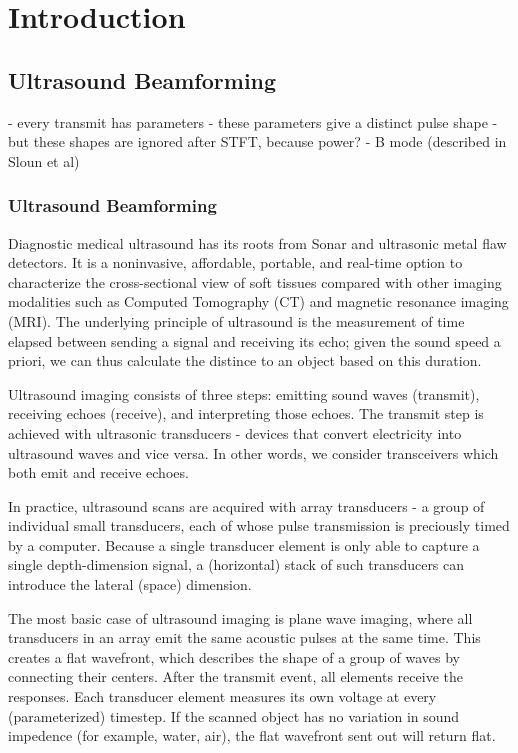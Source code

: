 \chapter{Introduction}

\section{Ultrasound Beamforming}

- every transmit has parameters
- these parameters give a distinct pulse shape
- but these shapes are ignored after STFT, because power?
- B mode (described in Sloun et al)

\subsection{Ultrasound Beamforming}
 Diagnostic medical ultrasound has its roots from Sonar and ultrasonic metal flaw detectors. It is a noninvasive, affordable, portable, and real-time option to characterize the cross-sectional view of soft tissues compared with other imaging modalities such as Computed Tomography (CT) and magnetic resonance imaging (MRI). The underlying principle of ultrasound is the measurement of time elapsed between sending a signal and receiving its echo; given the sound speed a priori, we can thus calculate the distince to an object based on this duration.

 Ultrasound imaging consists of three steps: emitting sound waves (transmit), receiving echoes (receive), and interpreting those echoes. The transmit step is achieved with ultrasonic transducers - devices that convert electricity into ultrasound waves and vice versa. In other words, we consider transceivers which both emit and receive echoes.

 In practice, ultrasound scans are acquired with array transducers - a group of individual small transducers, each of whose pulse transmission is preciously timed by a computer. Because a single transducer element is only able to capture a single depth-dimension signal, a (horizontal) stack of such transducers can introduce the lateral (space) dimension.

 The most basic case of ultrasound imaging is plane wave imaging, where all transducers in an array emit the same acoustic pulses at the same time. This creates a flat wavefront, which describes the shape of a group of waves by connecting their centers. After the transmit event, all elements receive the responses. Each transducer element measures its own voltage at every (parameterized) timestep. If the scanned object has no variation in sound impedence (for example, water, air), the flat wavefront sent out will return flat.

